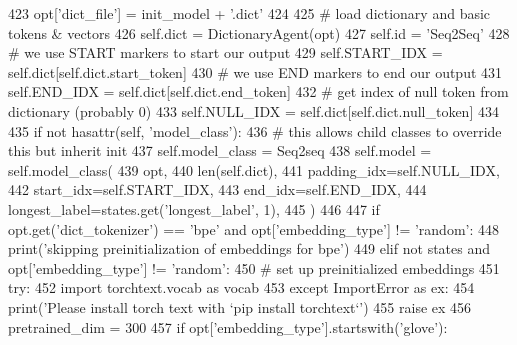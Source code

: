 \begin{DoxyCode}
423                     opt[\textcolor{stringliteral}{'dict\_file'}] = init\_model + \textcolor{stringliteral}{'.dict'}
424 
425             \textcolor{comment}{# load dictionary and basic tokens & vectors}
426             self.dict = DictionaryAgent(opt)
427             self.id = \textcolor{stringliteral}{'Seq2Seq'}
428             \textcolor{comment}{# we use START markers to start our output}
429             self.START\_IDX = self.dict[self.dict.start\_token]
430             \textcolor{comment}{# we use END markers to end our output}
431             self.END\_IDX = self.dict[self.dict.end\_token]
432             \textcolor{comment}{# get index of null token from dictionary (probably 0)}
433             self.NULL\_IDX = self.dict[self.dict.null\_token]
434 
435             \textcolor{keywordflow}{if} \textcolor{keywordflow}{not} hasattr(self, \textcolor{stringliteral}{'model\_class'}):
436                 \textcolor{comment}{# this allows child classes to override this but inherit init}
437                 self.model\_class = Seq2seq
438             self.model = self.model\_class(
439                 opt,
440                 len(self.dict),
441                 padding\_idx=self.NULL\_IDX,
442                 start\_idx=self.START\_IDX,
443                 end\_idx=self.END\_IDX,
444                 longest\_label=states.get(\textcolor{stringliteral}{'longest\_label'}, 1),
445             )
446 
447             \textcolor{keywordflow}{if} opt.get(\textcolor{stringliteral}{'dict\_tokenizer'}) == \textcolor{stringliteral}{'bpe'} \textcolor{keywordflow}{and} opt[\textcolor{stringliteral}{'embedding\_type'}] != \textcolor{stringliteral}{'random'}:
448                 print(\textcolor{stringliteral}{'skipping preinitialization of embeddings for bpe'})
449             \textcolor{keywordflow}{elif} \textcolor{keywordflow}{not} states \textcolor{keywordflow}{and} opt[\textcolor{stringliteral}{'embedding\_type'}] != \textcolor{stringliteral}{'random'}:
450                 \textcolor{comment}{# set up preinitialized embeddings}
451                 \textcolor{keywordflow}{try}:
452                     \textcolor{keyword}{import} torchtext.vocab \textcolor{keyword}{as} vocab
453                 \textcolor{keywordflow}{except} ImportError \textcolor{keyword}{as} ex:
454                     print(\textcolor{stringliteral}{'Please install torch text with `pip install torchtext`'})
455                     \textcolor{keywordflow}{raise} ex
456                 pretrained\_dim = 300
457                 \textcolor{keywordflow}{if} opt[\textcolor{stringliteral}{'embedding\_type'}].startswith(\textcolor{stringliteral}{'glove'}):

\end{DoxyCode}
